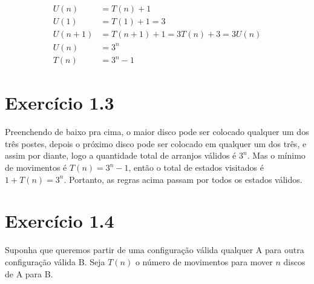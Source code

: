 \documentclass[10pt]{book}
\begin{document}
\begin{align*}
  U(n) & =T(n)+1 \\
  U(1) & =T(1)+1=3 \\
  U(n+1) & =T(n+1)+1=3T(n)+3=3U(n) \\
  U(n) & =3^n \\
  T(n) & =3^n-1
\end{align*}

\section{Exercício 1.3 }

Preenchendo de baixo pra cima, o maior disco pode ser colocado qualquer um dos três postes, depois o próximo disco pode ser colocado em qualquer um dos três, e assim por diante, logo a quantidade total de arranjos válidos é $3^n$. Mas o mínimo de movimentos é $T(n)=3^n-1$, então o total de estados visitados é $1+T(n)=3^n$. Portanto, as regras acima passam por todos os estados válidos.

\section{Exercício 1.4}

Suponha que queremos partir de uma configuração válida qualquer A para outra configuração válida B. Seja $T(n)$ o número de movimentos para mover $n$ discos de A para B.
\end{document}
